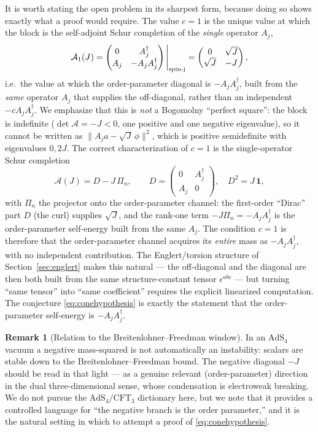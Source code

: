 \documentclass[11pt]{article}
\theoremstyle{plain}
\theoremstyle{definition}
\newtheorem{remark}[theorem]{Remark}
\newcommand{\cA}{\mathcal{A}}
\newcommand{\AdS}{\mathrm{AdS}}
\begin{document}
It is worth stating the open problem in its sharpest form, because doing so
shows exactly what a proof would require. The value $c=1$ is the unique value
at which the block is the self-adjoint Schur completion of the \emph{single}
operator $A_j$,
\begin{equation}
\cA_1(J)=
\begin{pmatrix}0&A_j^\dagger\\ A_j&-A_jA_j^\dagger\end{pmatrix}\Bigg|_{\rm spin\text{-}j}
=\begin{pmatrix}0&\sqrt J\\ \sqrt J&-J\end{pmatrix},
\end{equation}
i.e.\ the value at which the order-parameter diagonal is $-A_jA_j^\dagger$,
built from the \emph{same} operator $A_j$ that supplies the off-diagonal,
rather than an independent $-cA_jA_j^\dagger$. We emphasize that this is
\emph{not} a Bogomolny ``perfect square'': the block is indefinite
($\det\cA=-J<0$, one positive and one negative eigenvalue), so it cannot be
written as $\|A_ja-\sqrt J\,\phi\|^2$, which is positive semidefinite with
eigenvalues $0,2J$. The correct characterization of $c=1$ is the
single-operator Schur completion
\begin{equation}
\cA(J)=D-J\,\Pi_n,\qquad
D=\begin{pmatrix}0&A_j^\dagger\\ A_j&0\end{pmatrix},\quad D^2=J\,\bm1,
\label{eq:schurform}
\end{equation}
with $\Pi_n$ the projector onto the order-parameter channel: the first-order
``Dirac'' part $D$ (the curl) supplies $\sqrt J$, and the rank-one term
$-J\Pi_n=-A_jA_j^\dagger$ is the order-parameter self-energy built from the
same $A_j$. The condition $c=1$ is therefore that the order-parameter channel
acquires its \emph{entire} mass as $-A_jA_j^\dagger$, with no independent
contribution. The Englert/torsion structure of Section~\ref{sec:englert}
makes this natural --- the off-diagonal and the diagonal are then both built
from the same structure-constant tensor $\epsilon^{abc}$ --- but turning
``same tensor'' into ``same coefficient'' requires the explicit linearized
computation. The conjecture \eqref{eq:conehypothesis} is exactly the
statement that the order-parameter self-energy is $-A_jA_j^\dagger$.

\begin{remark}[Relation to the Breitenlohner--Freedman window]
In an $\AdS_4$ vacuum a negative mass-squared is not automatically an
instability: scalars are stable down to the Breitenlohner--Freedman bound.
The negative diagonal $-J$ should be read in that light --- as a genuine
relevant (order-parameter) direction in the dual three-dimensional sense,
whose condensation is electroweak breaking. We do not pursue the
$\AdS_4/\mathrm{CFT}_3$ dictionary here, but we note that it provides a
controlled language for ``the negative branch is the order parameter,'' and
it is the natural setting in which to attempt a proof of
\eqref{eq:conehypothesis}.
\end{remark}
\end{document}
